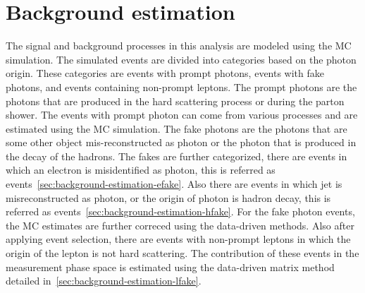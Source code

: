 \chapter{Background estimation}
\label{chap:background_estimation}

The signal and background processes in this analysis are modeled using the MC simulation. The simulated events are divided into categories based on the photon origin. These categories are events with prompt photons, events with fake photons, and events containing non-prompt leptons. The prompt photons are the photons that are produced in the hard scattering process or during the parton shower. The events with prompt photon can come from various processes and are estimated using the MC simulation. The fake photons are the photons that are some other object mis-reconstructed as photon or the photon that is produced in the decay of the hadrons. The fakes are further categorized, there are events in which an electron is misidentified as photon, this is referred as \efake events~\cref{sec:background-estimation-efake}. Also there are events in which jet is misreconstructed as photon, or the origin of photon is hadron decay, this is referred as \hfake events~\cref{sec:background-estimation-hfake}. For the fake photon events, the MC estimates are further correced using the data-driven methods.  Also after applying event selection, there are events with non-prompt leptons in which the origin of the lepton is not hard scattering. The contribution of these events in the measurement phase space is estimated using the data-driven matrix method detailed in~\cref{sec:background-estimation-lfake}.




